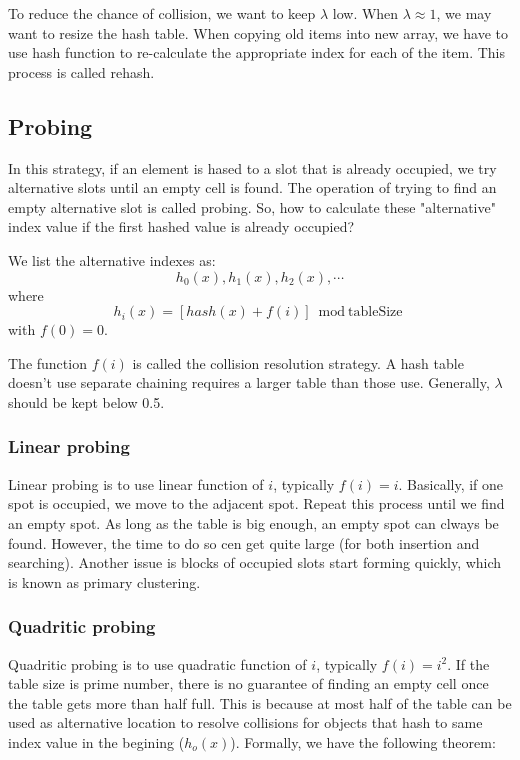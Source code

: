 \documentclass[12pt]{book}
\begin{document}
To reduce the chance of collision, we want to keep \(\lambda\) low. When \(\lambda \approx 1\), we may want to resize the hash table. When copying old items into new array, we have to use hash function to re-calculate the appropriate index for each of the item. This process is called rehash.

\subsection{Probing}
\label{sec:orgd7e9df2}
In this strategy, if an element is hased to a slot that is already occupied, we try alternative slots until an empty cell is found. The operation of trying to find an empty alternative slot is called probing. So, how to calculate these "alternative" index value if the first hashed value is already occupied?

We list the alternative indexes as:
\[
h_0(x), h_1(x), h_2(x), \cdots
\]
where
\[
h_i(x) = [hash(x) + f(i)] \bmod \text {tableSize}
\]
with \(f(0) = 0\).

The function \(f(i)\) is called the collision resolution strategy. A hash table doesn't use separate chaining requires a larger table than those use. Generally, \(\lambda\) should be kept below 0.5.

\subsubsection{Linear probing}
\label{sec:org8a72cad}
Linear probing is to use linear function of \(i\), typically \(f(i) = i\). Basically, if one spot is occupied, we move to the adjacent spot. Repeat this process until we find an empty spot. As long as the table is big enough, an empty spot can clways be found. However, the time to do so cen get quite large (for both insertion and searching). Another issue is blocks of occupied slots start forming quickly, which is known as primary clustering. 

\subsubsection{Quadritic probing}
\label{sec:org2141d4f}
Quadritic probing is to use quadratic function of \(i\), typically \(f(i) = i^2\). If the table size is prime number, there is no guarantee of finding an empty cell once the table gets more than half full. This is because at most half of the table can be used as alternative location to resolve collisions for objects that hash to same index value in the begining (\(h_o(x)\)). Formally, we have the following theorem:
\end{document}
